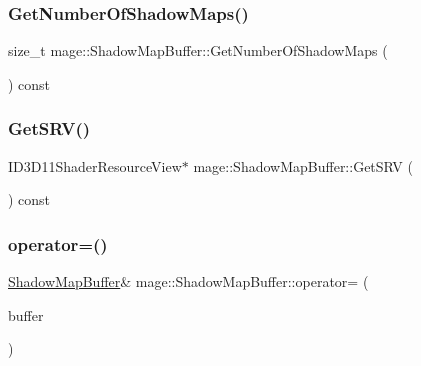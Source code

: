 \hypertarget{structmage_1_1_shadow_map_buffer_ab0b78c26663aa303d8f72dc89ec25eea}{}\label{structmage_1_1_shadow_map_buffer_ab0b78c26663aa303d8f72dc89ec25eea} 
\subsubsection{\texorpdfstring{Get\+Number\+Of\+Shadow\+Maps()}{GetNumberOfShadowMaps()}}
{\footnotesize\ttfamily size\+\_\+t mage\+::\+Shadow\+Map\+Buffer\+::\+Get\+Number\+Of\+Shadow\+Maps (\begin{DoxyParamCaption}{ }\end{DoxyParamCaption}) const\hspace{0.3cm}{\ttfamily [noexcept]}}

\hypertarget{structmage_1_1_shadow_map_buffer_a3c923d6cea528af3420085fafd8f9f8e}{}\label{structmage_1_1_shadow_map_buffer_a3c923d6cea528af3420085fafd8f9f8e} 
\subsubsection{\texorpdfstring{Get\+S\+R\+V()}{GetSRV()}}
{\footnotesize\ttfamily I\+D3\+D11\+Shader\+Resource\+View$\ast$ mage\+::\+Shadow\+Map\+Buffer\+::\+Get\+S\+RV (\begin{DoxyParamCaption}{ }\end{DoxyParamCaption}) const\hspace{0.3cm}{\ttfamily [noexcept]}}

\hypertarget{structmage_1_1_shadow_map_buffer_ace8a042252b8285a7f6ceb838053f7f6}{}\label{structmage_1_1_shadow_map_buffer_ace8a042252b8285a7f6ceb838053f7f6} 
\subsubsection{\texorpdfstring{operator=()}{operator=()}\hspace{0.1cm}{\footnotesize\ttfamily [1/2]}}
{\footnotesize\ttfamily \hyperlink{structmage_1_1_shadow_map_buffer}{Shadow\+Map\+Buffer}\& mage\+::\+Shadow\+Map\+Buffer\+::operator= (\begin{DoxyParamCaption}\item[{const \hyperlink{structmage_1_1_shadow_map_buffer}{Shadow\+Map\+Buffer} \&}]{buffer }\end{DoxyParamCaption})\hspace{0.3cm}{\ttfamily [delete]}}

